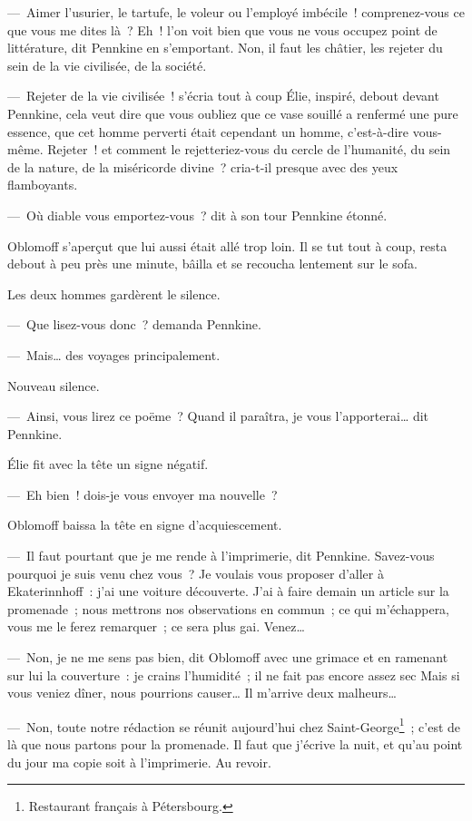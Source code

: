 \documentclass[french,twoside]{book} %
\begin{document}
— Aimer l’usurier, le tartufe, le voleur ou l’employé imbécile ! comprenez-vous ce que vous me dites là ? Eh ! l’on voit bien que vous ne vous occupez point de littérature, dit Pennkine en s’emportant. Non, il faut les châtier, les rejeter du sein de la vie civilisée, de la société.\par
— Rejeter de la vie civilisée ! s’écria tout à coup Élie, inspiré, debout devant Pennkine, cela veut dire que vous oubliez que ce vase souillé a renfermé une pure essence, que cet homme perverti était cependant un homme, c’est-à-dire vous-même. Rejeter ! et comment le rejetteriez-vous du cercle de l’humanité, du sein de la nature, de la miséricorde divine ? cria-t-il presque avec des yeux flamboyants.\par
— Où diable vous emportez-vous ? dit à son tour Pennkine étonné.\par
Oblomoff s’aperçut que lui aussi était allé trop loin. Il se tut tout à coup, resta debout à peu près une minute, bâilla et se recoucha lentement sur le sofa.\par
Les deux hommes gardèrent le silence.\par
— Que lisez-vous donc ? demanda Pennkine.\par
— Mais… des voyages principalement.\par
Nouveau silence.\par
— Ainsi, vous lirez ce poëme ? Quand il paraîtra, je vous l’apporterai… dit Pennkine.\par
Élie fit avec la tête un signe négatif.\par
— Eh bien ! dois-je vous envoyer ma nouvelle ?\par
Oblomoff baissa la tête en signe d’acquiescement.\par
— Il faut pourtant que je me rende à l’imprimerie, dit Pennkine. Savez-vous pourquoi je suis venu chez vous ? Je voulais vous proposer d’aller à Ekaterinnhoff : j’ai une voiture découverte. J’ai à faire demain un article sur la promenade ; nous mettrons nos observations en commun ; ce qui m’échappera, vous me le ferez remarquer ; ce sera plus gai. Venez…\par
— Non, je ne me sens pas bien, dit Oblomoff avec une grimace et en ramenant sur lui la couverture : je crains l’humidité ; il ne fait pas encore assez sec Mais si vous veniez dîner, nous pourrions causer… Il m’arrive deux malheurs…\par
— Non, toute notre rédaction se réunit aujourd’hui chez Saint-George\footnote{Restaurant français à Pétersbourg.} ; c’est de là que nous partons pour la promenade. Il faut que j’écrive la nuit, et qu’au point du jour ma copie soit à l’imprimerie. Au revoir.\par
\end{document}
